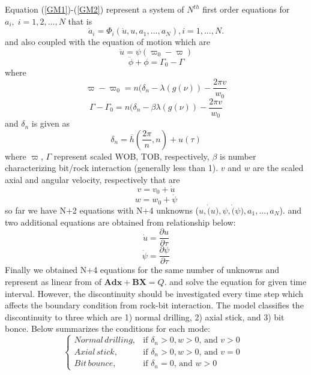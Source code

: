 Equation (\ref{GM1})-(\ref{GM2}) represent a system of $N^{th}$ first order equations for $a_i,\; i=1,2,...,N$ that is
\begin{equation}\label{Norder}
  \dot{a}_i = \Phi_i(\dot{u}, u, a_1, ..., a_N), i=1,...,N.
\end{equation}
and also coupled with the equation of motion which are
\begin{equation}\label{GE1_}
  \ddot{u} = \psi(\varpi_0 - \varpi)
\end{equation}
\begin{equation}\label{GE2_}
  \ddot{\phi} + \phi = \Gamma_0 - \Gamma
\end{equation}
where
\begin{equation}\label{GE1}
  \varpi-\varpi_0 = n(\delta_n - \lambda(g(\nu)) - \frac{2\pi v}{w_0}
\end{equation}
\begin{equation}\label{GE2}
  \Gamma-\Gamma_0 = n(\delta_n -\beta \lambda(g(\nu)) - \frac{2\pi v}{w_0}
\end{equation}
and $\delta_n$ is given as
\begin{equation}\label{deltan1}
  \delta_n = \overline{h}\left(\frac{2\pi}{n}, n\right) + u(\tau)
\end{equation}
where $\varpi$, $\Gamma$ represent scaled WOB, TOB, respectively,  $\beta$ is number characterizing bit/rock interaction (generally less than 1). $v$ and $w$ are the scaled axial and angular velocity, respectively that are
\begin{equation}\label{scaled_axial_ve}
  v = v_0 + \dot{u}
\end{equation}
\begin{equation}\label{scaled_angular_vel}
  w = w_0 + \dot{\psi}
\end{equation}
so far we have N+2 equations with N+4 unknowns ($u, \dot(u), \psi, \dot(\psi), a_1, ..., a_N$). and two additional equations are obtained from relationship below:
\begin{equation}\label{axial_dis_vel}
  \dot{u} = \frac{\partial u}{\partial \tau}
\end{equation}
\begin{equation}\label{angular_dis_vel}
  \dot{\psi} = \frac{\partial \psi}{\partial \tau}
\end{equation}
Finally we obtained N+4 equations for the same number of unknowns and represent as linear from of $\bm{Adx} + \bm{BX} = Q$. and solve the equation for given time interval. However, the discontinuity should be investigated every time step which affects the boundary condition from rock-bit interaction. The model classifies the discontinuity to three which are 1) normal drilling, 2) axial stick, and 3) bit bonce. Below summarizes the conditions for each mode:
\begin{equation}\label{drillingmodes}
  \begin{cases}
    Normal\,drilling, & \mbox{if $\delta_n > 0, w > 0$, and $v > 0$ }  \\
    Axial\, stick, & \mbox{if $\delta_n >0, w > 0$, and $v = 0$ } \\
    Bit\,bounce, & \mbox{if $\delta_n = 0$, and $w > 0$}
  \end{cases}
\end{equation}

